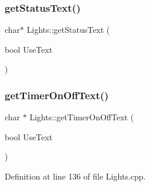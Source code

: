 \subsubsection{\texorpdfstring{get\+Status\+Text()}{getStatusText()}\hspace{0.1cm}{\footnotesize\ttfamily [2/2]}}
{\footnotesize\ttfamily char$\ast$ Lights\+::get\+Status\+Text (\begin{DoxyParamCaption}\item[{bool}]{Use\+Text }\end{DoxyParamCaption})}

\mbox{\label{class_lights_a8899969e0175e8242f9139c17585bcd0}} 
\subsubsection{\texorpdfstring{get\+Timer\+On\+Off\+Text()}{getTimerOnOffText()}\hspace{0.1cm}{\footnotesize\ttfamily [1/2]}}
{\footnotesize\ttfamily char $\ast$ Lights\+::get\+Timer\+On\+Off\+Text (\begin{DoxyParamCaption}\item[{bool}]{Use\+Text }\end{DoxyParamCaption})}



Definition at line 136 of file Lights.\+cpp.

